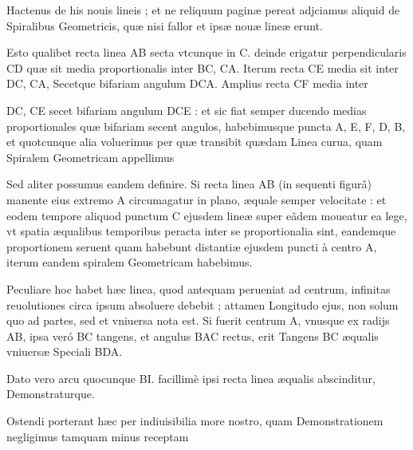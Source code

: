 \documentclass[11pt,a4paper]{article}
\begin{document}
Hactenus de his nouis lineis ; et ne reliquum paginæ pereat adjciamus aliquid de Spiralibus Geometricis, quæ nisi fallor et ipsæ nouæ lineæ erunt.

Esto qualibet recta linea AB secta vtcunque in C. deinde erigatur perpendicularis CD quæ sit media proportionalis inter BC, CA. Iterum recta CE media sit inter DC, CA, Secetque bifariam angulum DCA. Amplius recta CF media inter


DC, CE secet bifariam angulum DCE : et sic fiat semper ducendo medias proportionales quæ bifariam secent angulos, habebimusque puncta A, E, F, D, B, et quotcunque alia voluerimus per quæ transibit quædam Linea curua, quam Spiralem Geometricam appellimus

Sed aliter possumus eandem definire. Si recta linea AB (in sequenti figurâ) manente eius extremo A circumagatur in plano, æquale semper velocitate : et eodem tempore aliquod punctum C ejusdem lineæ super eâdem moueatur ea lege, vt spatia æqualibus temporibus peracta inter se proportionalia sint, eandemque proportionem seruent quam habebunt distantiæ ejusdem puncti à centro A, iterum eandem spiralem Geometricam habebimus.

Peculiare hoc habet hæc linea, quod antequam perueniat ad centrum, infinitas reuolutiones circa ipsum absoluere debebit ; attamen Longitudo ejus, non solum quo ad partes, sed et vniuersa nota est. Si fuerit centrum A, vnusque ex radijs AB, ipsa veró BC tangens, et angulus BAC rectus, erit Tangens BC æqualis vniuersæ Speciali BDA.

Dato vero arcu quocunque BI. facillimè ipsi recta linea æqualis abscinditur, Demonstraturque.

Ostendi porterant hæc per indiuisibilia more nostro, quam Demonstrationem negligimus tamquam minus receptam
\end{document}
